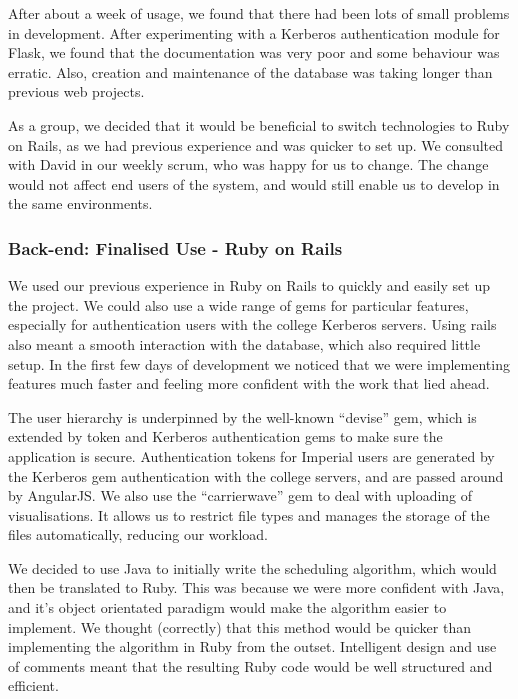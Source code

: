 \documentclass[a4paper, titlepage]{article}
\begin{document}
After about a week of usage, we found that there had been lots of small problems in development. After 
experimenting with a Kerberos authentication module for Flask, we found that the documentation was 
very poor and some behaviour was erratic. Also, creation and maintenance of the database was taking 
longer than previous web projects. 

As a group, we decided that it would be beneficial to switch technologies to Ruby on Rails, as we had
previous experience and was quicker to set up. We consulted with David in our weekly scrum, who was
happy for us to change. The change would not affect end users of the system, and would still enable us 
to develop in the same environments. 

\subsubsection{Back-end: Finalised Use - Ruby on Rails} \label{sec:impl_RoR}

We used our previous experience in Ruby on Rails to quickly and easily set up the project. We could also
use a wide range of gems for particular features, especially for authentication users with the college
Kerberos servers. Using rails also meant a smooth interaction with the database, which also required 
little setup. In the first few days of development we noticed that we were implementing features much
faster and feeling more confident with the work that lied ahead. 

The user hierarchy is underpinned by the well-known ``devise'' gem, which is extended by token and 
Kerberos authentication gems to make sure the application is secure. Authentication tokens for Imperial 
users are generated by the Kerberos gem authentication with the college servers, and are passed around 
by AngularJS. We also use the ``carrierwave'' gem to deal with uploading of visualisations. It allows us
to restrict file types and manages the storage of the files automatically, reducing our workload. 

We decided to use Java to initially write the scheduling algorithm, which would then be translated to 
Ruby. This was because we were more confident with Java, and it's object orientated paradigm would make 
the algorithm easier to implement. We thought (correctly) that this method would be quicker than
implementing the algorithm in Ruby from the outset. Intelligent design and use of comments meant that
the resulting Ruby code would be well structured and efficient.
  
\end{document}

